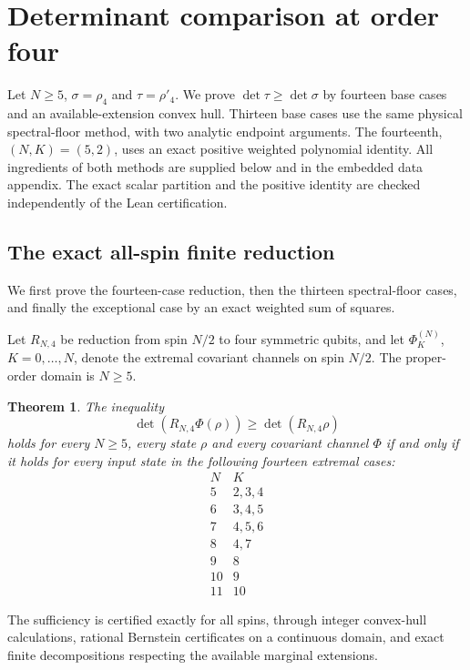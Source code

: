 \documentclass[11pt,a4paper]{article}
\newtheorem{theorem}{Theorem}
\begin{document}
\clearpage
\section{Determinant comparison at order four}\label{sec:t4}
Let $N\ge5$, $\sigma=\rho_4$ and $\tau=\rho'_4$. We prove
$\det\tau\ge\det\sigma$ by fourteen base cases and an available-extension
convex hull. Thirteen base cases use the same physical spectral-floor
method, with two analytic endpoint arguments. The fourteenth,
$(N,K)=(5,2)$, uses an exact positive weighted polynomial identity.
All ingredients of both methods are supplied below and in the embedded
data appendix. The exact scalar partition and the positive identity are checked
independently of the Lean certification.

\subsection{The exact all-spin finite reduction}
We first prove the fourteen-case reduction, then the thirteen spectral-floor
cases, and finally the exceptional case by an exact weighted sum of squares.

Let $R_{N,4}$ be reduction from spin $N/2$ to four symmetric qubits,
and let $\Phi_K^{(N)}$, $K=0,\ldots,N$, denote the extremal covariant
channels on spin $N/2$. The proper-order domain is $N\ge5$.

\begin{theorem}
The inequality
\[
 \det(R_{N,4}\Phi(\rho))\ge\det(R_{N,4}\rho)
\]
holds for every $N\ge5$, every state $\rho$ and every covariant
channel $\Phi$ if and only if it holds for every input state in
the following fourteen extremal cases:
\[
\begin{array}{c|l}
 N&K\\\hline
 5&2,3,4\\
 6&3,4,5\\
 7&4,5,6\\
 8&4,7\\
 9&8\\
 10&9\\
 11&10
\end{array}
\]
\end{theorem}

The sufficiency is certified exactly for all spins, through
integer convex-hull calculations, rational Bernstein certificates
on a continuous domain, and exact finite decompositions respecting
the available marginal extensions.
\end{document}
